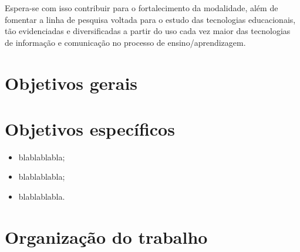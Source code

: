 Espera-se com isso contribuir para o fortalecimento da modalidade, além de
fomentar a linha de pesquisa voltada para o estudo das tecnologias educacionais,
tão evidenciadas e diversificadas a partir do uso cada vez maior das tecnologias
de informação e comunicação no processo de ensino/aprendizagem.

\section{Objetivos gerais}

\lipsum[1]

\section{Objetivos específicos}

\begin{itemize}
	\item blablablabla;
    \item blablablabla;
    \item blablablabla.
\end{itemize}

\section{Organização do trabalho}

\lipsum[10-12]
